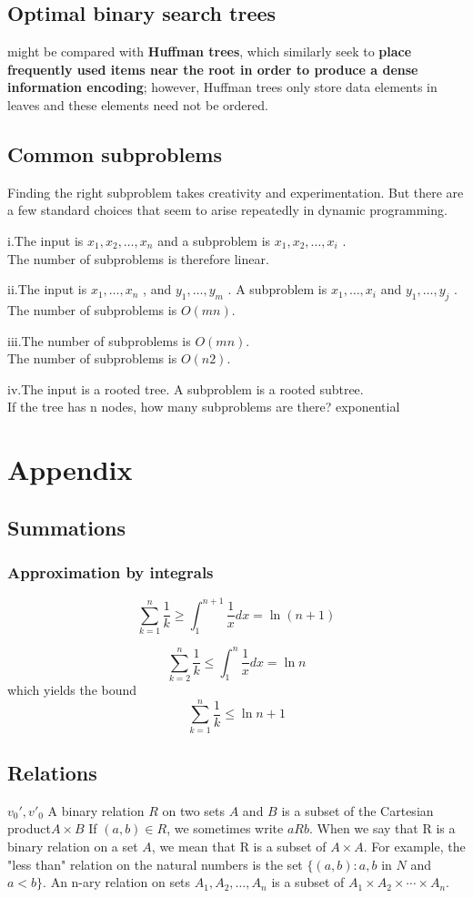 \documentclass{article}
\begin{document}
\subsection{Optimal binary search trees}
might be compared with \textbf{Huffman trees}, which similarly seek to \textbf{place frequently used items near the root in order to produce a dense information encoding}; however, Huffman trees only store data elements in leaves and these elements need not be ordered.

\subsection{Common subproblems}
Finding the right subproblem takes creativity and experimentation. But there are a few standard choices that seem to arise repeatedly in dynamic programming.

i.The input is $x_1 ,x_2 ,\ldots ,x_n$ and a subproblem is $x_1,x_2,\ldots,x_i$ .\\
The number of subproblems is therefore linear.

ii.The input is $x_1,\ldots,x_n$ , and $y_1 ,\ldots ,y_m$ . A subproblem is $x_1 ,\ldots ,x_i$ and $y_1 ,\ldots ,y_j$ .\\
The number of subproblems is $O(mn)$.

iii.The number of subproblems is $O(mn)$.\\
The number of subproblems is $O(n2)$.

iv.The input is a rooted tree. A subproblem is a rooted subtree.\\
If the tree has n nodes, how many subproblems are there? exponential
\section{Appendix}
\subsection{Summations}
\subsubsection{Approximation by integrals}
$$
\sum_{k=1}^n \frac{ 1}{k} \geq \int_1^{n+1}\frac{1}{x}dx = \ln(n+1)
$$

$$
\sum_{k=2}^n \frac{ 1}{k} \leq \int_1^{n}\frac{1}{x}dx = \ln n
$$
which yields the bound
$$
\sum_{k=1}^n \frac{ 1}{k} \leq \ln n + 1
$$

\subsection{Relations}
$v_0',v'_0$
A binary relation $R$ on two sets $A$ and $B$ is a subset of the Cartesian product$A \times B$
If $(a, b) \in R$, we sometimes write $a R b$. When we say that R is a binary relation on a set $A$, we mean that R is a subset of $A \times A$. For example, the "less than" relation on the natural numbers is the set $\{(a, b) : a, b$ in $N$ and $a < b\}$. An n-ary relation on sets $A_1, A_2,\ldots, A_n$ is a subset of $A_1 \times A_2 \times \cdots \times  A_n$.
\end{document}
